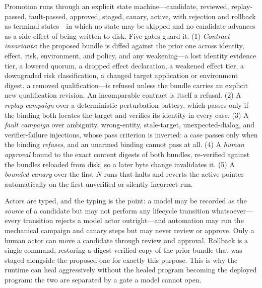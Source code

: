 Promotion runs through an explicit state machine---candidate, reviewed,
replay-passed, fault-passed, approved, staged, canary, active, with rejection
and rollback as terminal states---in which no state may be skipped and no
candidate advances as a side effect of being written to disk. Five gates guard
it. (1) \emph{Contract invariants}: the proposed bundle is diffed against the
prior one across identity, effect, risk, environment, and policy, and any
weakening---a lost identity evidence tier, a lowered quorum, a dropped effect
declaration, a weakened effect tier, a downgraded risk classification, a changed
target application or environment digest, a removed qualification---is refused
unless the bundle carries an explicit new qualification revision. An
incomparable contract is itself a refusal. (2) A \emph{replay campaign} over a
deterministic perturbation battery, which passes only if the binding both
locates the target and verifies its identity in every case. (3) A \emph{fault
campaign} over ambiguity, wrong-entity, stale-target, unexpected-dialog, and
verifier-failure injections, whose pass criterion is inverted: a case passes
only when the binding \emph{refuses}, and an unarmed binding cannot pass at all.
(4) A \emph{human approval} bound to the exact content digests of both bundles,
re-verified against the bundles reloaded from disk, so a later byte change
invalidates it. (5) A \emph{bounded canary} over the first $N$ runs that halts
and reverts the active pointer automatically on the first unverified or silently
incorrect run.

Actors are typed, and the typing is the point: a model may be recorded as the
\emph{source} of a candidate but may not perform any lifecycle transition
whatsoever---every transition rejects a model actor outright---and automation
may run the mechanical campaign and canary steps but may never review or
approve. Only
a human actor can move a candidate through review and approval. Rollback is a
single command, restoring a digest-verified copy of the prior bundle that was
staged alongside the proposed one for exactly this purpose. This is why the
runtime can heal aggressively without the healed program becoming the deployed
program: the two are separated by a gate a model cannot open.

